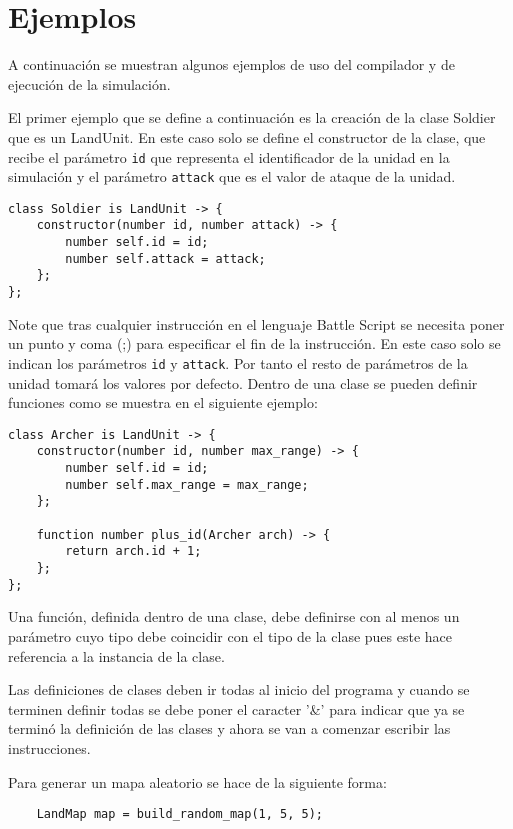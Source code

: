 \section{Ejemplos}

A continuación se muestran algunos ejemplos de uso del compilador y de ejecución de la simulación.

El primer ejemplo que se define a continuación es la creación de la clase Soldier que es un LandUnit. En este caso solo se define el constructor de la clase, que recibe el parámetro \verb|id| que representa el identificador de la unidad en la simulación y el par\'ametro \verb|attack| que es el valor de ataque de la unidad.

\begin{verbatim}
class Soldier is LandUnit -> {  
    constructor(number id, number attack) -> {
        number self.id = id;
        number self.attack = attack;
    };
}; 
\end{verbatim}

Note que tras cualquier instrucción en el lenguaje Battle Script se necesita poner un punto y coma (;) para especificar el fin de la instrucción. En este caso solo se indican los par\'ametros \verb|id| y \verb|attack|. Por tanto el resto de par\'ametros de la unidad tomar\'a los valores por defecto. Dentro de una clase se pueden definir funciones como se muestra en el siguiente ejemplo:

\begin{verbatim}
class Archer is LandUnit -> {
    constructor(number id, number max_range) -> {
        number self.id = id;
        number self.max_range = max_range;
    };
		
    function number plus_id(Archer arch) -> {
        return arch.id + 1;
    };
};
\end{verbatim}

Una funci\'on, definida dentro de una clase, debe definirse con al menos un par\'ametro cuyo tipo debe coincidir con el tipo de la clase pues este hace referencia a la instancia de la clase.

Las definiciones de clases deben ir todas al inicio del programa y cuando se terminen definir todas se debe poner el caracter '\&' para indicar que ya se termin\'o la definici\'on de las clases y ahora se van a comenzar escribir las instrucciones.

Para generar un mapa aleatorio se hace de la siguiente forma:

\begin{verbatim}
	LandMap map = build_random_map(1, 5, 5);
\end{verbatim} 

